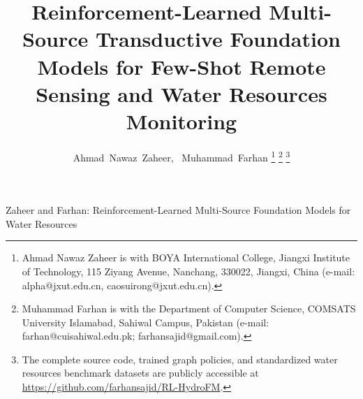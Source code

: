 \documentclass[journal]{IEEEtran}
\begin{document}
\title{Reinforcement-Learned Multi-Source Transductive Foundation Models for Few-Shot Remote Sensing and Water Resources Monitoring}

\author{Ahmad~Nawaz~Zaheer, ~Muhammad~Farhan%
\thanks{Ahmad Nawaz Zaheer is with BOYA International College, Jiangxi Institute of Technology, 115 Ziyang Avenue, Nanchang, 330022, Jiangxi, China (e-mail: alpha@jxut.edu.cn, caosuirong@jxut.edu.cn).}%
\thanks{Muhammad Farhan is with the Department of Computer Science, COMSATS University Islamabad, Sahiwal Campus, Pakistan (e-mail: farhan@cuisahiwal.edu.pk; farhansajid@gmail.com).}%
\thanks{The complete source code, trained graph policies, and standardized water resources benchmark datasets are publicly accessible at \protect\url{https://github.com/farhansajid/RL-HydroFM}.}%
}

%
{Zaheer and Farhan: Reinforcement-Learned Multi-Source Foundation Models for Water Resources}

\maketitle
\end{document}
